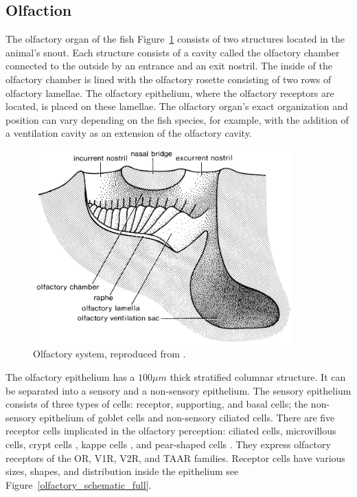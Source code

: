     \subsection{Olfaction}
    The olfactory organ of the fish Figure~\ref{olfactory_schematic} consists of two structures located in the animal's snout. Each structure consists of a cavity called the olfactory chamber connected to the outside by an entrance and an exit nostril. The inside of the olfactory chamber is lined with the olfactory rosette consisting of two rows of olfactory lamellae. The olfactory epithelium, where the olfactory receptors are located, is placed on these lamellae. The olfactory organ's exact organization and position can vary depending on the fish species, for example, with the addition of a ventilation cavity as an extension of the olfactory cavity.

    \begin{figure}[h]
      \centering
      \includegraphics[width=10cm]{part_2/assets/olfactory_schematic.png}
      \caption{Olfactory system, reproduced from \cite{hara2012fish}.}
      \label{olfactory_schematic}
    \end{figure}


    The olfactory epithelium has a $100\mu m$ thick stratified columnar structure. It can be separated into a sensory and a non-sensory epithelium. The sensory epithelium consists of three types of cells: receptor, supporting, and basal cells; the non-sensory epithelium of goblet cells and non-sensory ciliated cells. There are five receptor cells implicated in the olfactory perception: ciliated cells, microvillous cells, crypt cells \cite{ichikawa1977fine,hansen2005diversity}, kappe cells \cite{ahuja2014kappe}, and pear-shaped cells \cite{wakisaka2017adenosine}. They express olfactory receptors of the OR, V1R, V2R, and TAAR families. Receptor cells have various sizes, shapes, and distribution inside the epithelium see Figure~\ref{olfactory_schematic_full}.

